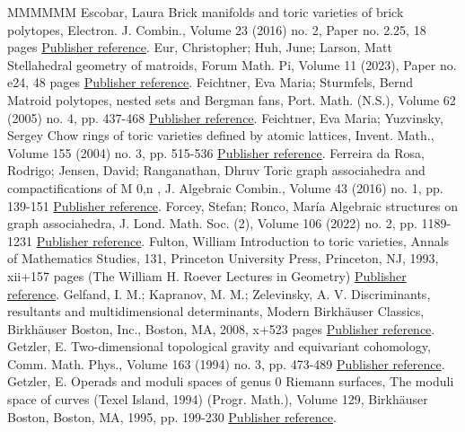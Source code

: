 \begin{thebibliography}{MMMMMM}
 Escobar, Laura Brick manifolds and toric varieties of brick polytopes, Electron. J. Combin., Volume 23 (2016) no. 2, Paper no. 2.25, 18 pages \href{https://alco.centre-mersenne.org/articles/10.5802/alco.347/#MR3512647}{Publisher reference}.
 Eur, Christopher; Huh, June; Larson, Matt Stellahedral geometry of matroids, Forum Math. Pi, Volume 11 (2023), Paper no. e24, 48 pages \href{https://alco.centre-mersenne.org/articles/10.5802/alco.347/#Stellar}{Publisher reference}.
 Feichtner, Eva Maria; Sturmfels, Bernd Matroid polytopes, nested sets and Bergman fans, Port. Math. (N.S.), Volume 62 (2005) no. 4, pp. 437-468 \href{https://alco.centre-mersenne.org/articles/10.5802/alco.347/#MR2191630}{Publisher reference}.
 Feichtner, Eva Maria; Yuzvinsky, Sergey Chow rings of toric varieties defined by atomic lattices, Invent. Math., Volume 155 (2004) no. 3, pp. 515-536 \href{https://alco.centre-mersenne.org/articles/10.5802/alco.347/#MR2038195}{Publisher reference}.
 Ferreira da Rosa, Rodrigo; Jensen, David; Ranganathan, Dhruv Toric graph associahedra and compactifications of M 0,n , J. Algebraic Combin., Volume 43 (2016) no. 1, pp. 139-151 \href{https://alco.centre-mersenne.org/articles/10.5802/alco.347/#MR3439304}{Publisher reference}.
 Forcey, Stefan; Ronco, María Algebraic structures on graph associahedra, J. Lond. Math. Soc. (2), Volume 106 (2022) no. 2, pp. 1189-1231 \href{https://alco.centre-mersenne.org/articles/10.5802/alco.347/#jlms.12596}{Publisher reference}.
 Fulton, William Introduction to toric varieties, Annals of Mathematics Studies, 131, Princeton University Press, Princeton, NJ, 1993, xii+157 pages (The William H. Roever Lectures in Geometry) \href{https://alco.centre-mersenne.org/articles/10.5802/alco.347/#MR1234037}{Publisher reference}.
 Gelfand, I. M.; Kapranov, M. M.; Zelevinsky, A. V. Discriminants, resultants and multidimensional determinants, Modern Birkhäuser Classics, Birkhäuser Boston, Inc., Boston, MA, 2008, x+523 pages \href{https://alco.centre-mersenne.org/articles/10.5802/alco.347/#MR2394437}{Publisher reference}.
 Getzler, E. Two-dimensional topological gravity and equivariant cohomology, Comm. Math. Phys., Volume 163 (1994) no. 3, pp. 473-489 \href{https://alco.centre-mersenne.org/articles/10.5802/alco.347/#MR1284793}{Publisher reference}.
 Getzler, E. Operads and moduli spaces of genus 0 Riemann surfaces, The moduli space of curves (Texel Island, 1994) (Progr. Math.), Volume 129, Birkhäuser Boston, Boston, MA, 1995, pp. 199-230 \href{https://alco.centre-mersenne.org/articles/10.5802/alco.347/#MR1363058}{Publisher reference}.

\end{thebibliography}
